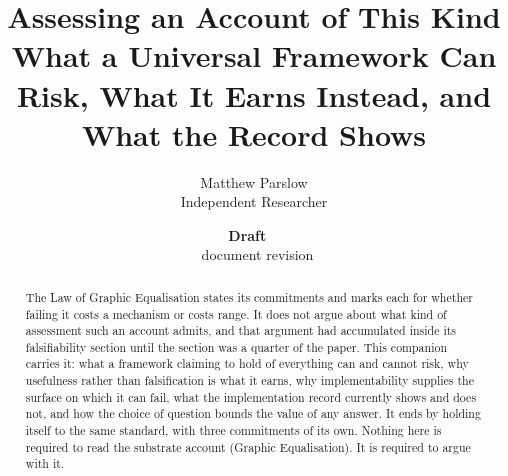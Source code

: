 \documentclass[11pt,a4paper]{article}
\title{Assessing an Account of This Kind\\\large What a Universal Framework Can Risk, What It Earns Instead, and What the Record Shows}
\author{Matthew Parslow\\Independent Researcher}
\date{\textbf{Draft \texorpdfstring{\textemdash}{---}\ \PaperDraft}\\[2pt]\PaperDisplayDate \texorpdfstring{\textbullet}{\textperiodcentered}\ document revision \PaperRevision}
\begin{document}
\maketitle
\begin{center}
\end{center}
\vspace{1em}
\begin{abstract}
The Law of Graphic Equalisation states its commitments and marks each for whether failing it costs a
mechanism or costs range. It does not argue about what kind of assessment such an account admits, and
that argument had accumulated inside its falsifiability section until the section was a quarter of the
paper. This companion carries it: what a framework claiming to hold of everything can and cannot risk,
why usefulness rather than falsification is what it earns, why implementability supplies the surface on
which it can fail, what the implementation record currently shows and does not, and how the choice of
question bounds the value of any answer. It ends by holding itself to the same standard, with three commitments of its own. Nothing here is required to read the
substrate account (Graphic Equalisation). It is required to argue with it.
\end{abstract}
\end{document}
